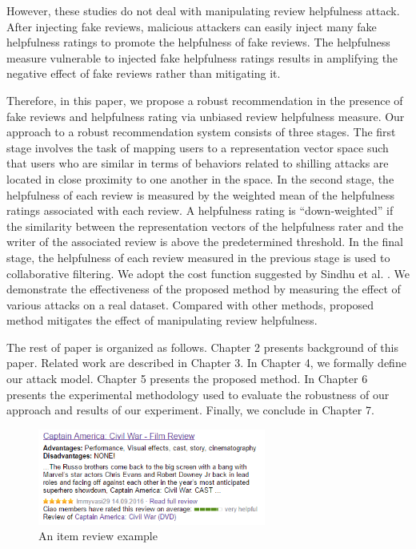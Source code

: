 \documentclass[master,english,final]{kaist-ucs}
\begin{document}
However, these studies do not deal with manipulating review helpfulness attack.
After injecting fake reviews, malicious attackers can easily inject many fake helpfulness ratings to promote the helpfulness of fake reviews.
The helpfulness measure vulnerable to injected fake helpfulness ratings results in amplifying the negative effect of fake reviews rather than mitigating it.

Therefore, in this paper, we propose a robust recommendation in the presence of fake reviews and helpfulness rating via unbiased review helpfulness measure.
Our approach to a robust recommendation system consists of three stages.
The first stage involves the task of mapping users to a representation vector space such that users who are similar in terms of behaviors related to shilling attacks are located in close proximity to one another in the space.
In the second stage, the helpfulness of each review is measured by the weighted mean of the helpfulness ratings associated with each review.
A helpfulness rating is “down-weighted” if the similarity between the representation vectors of the helpfulness rater and the writer of the associated review is above the predetermined threshold.
In the final stage, the helpfulness of each review measured in the previous stage is used to collaborative filtering.
We adopt the cost function suggested by Sindhu et al. \cite{RQMF}.
We demonstrate the effectiveness of the proposed method by measuring the effect of various attacks on a real dataset.
Compared with other methods, proposed method mitigates the effect of manipulating review helpfulness.

The rest of paper is organized as follows.
Chapter 2 presents background of this paper.
Related work are described in Chapter 3.
In Chapter 4, we formally define our attack model.
Chapter 5 presents the proposed method.
In Chapter 6 presents the experimental methodology used to evaluate the robustness of our approach and results of our experiment.
Finally, we conclude in Chapter 7.


\begin{figure}[h]
    \centerline{\includegraphics[width=7.5cm]{figure/item_review_example}}
    \caption{ An item review example    } \label{item_review_example}
\end{figure}
\end{document}
